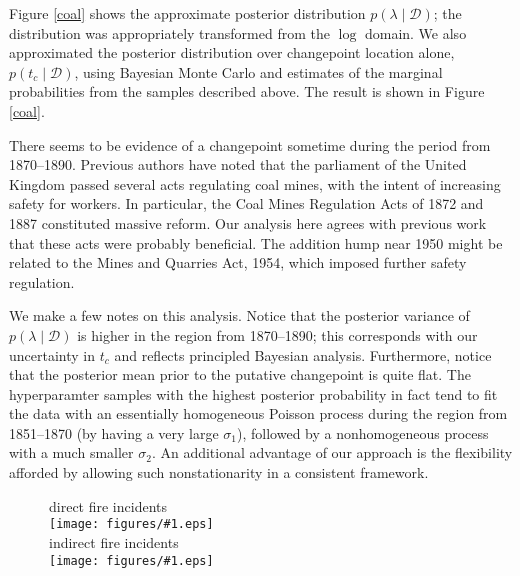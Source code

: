 \documentclass{article}
\newcommand{\psff}[1]{\texttt{[image: figures/\#1.eps]}}
\newcommand{\cm}[1]{\mathcal{#1}}
\newcommand{\data}{\cm{D}}
\newcommand{\given}{\mid}
\begin{document}
Figure \ref{coal} shows the approximate posterior
distribution $p(\lambda \given \data)$; the distribution was
appropriately transformed from the $\log$ domain.  We also
approximated the posterior distribution over changepoint location
alone, $p(t_c \given \data)$, using Bayesian Monte Carlo and estimates
of the marginal probabilities from the samples described above.  The
result is shown in Figure \ref{coal}.

There seems to be evidence of a changepoint sometime during the period
from 1870--1890.  Previous authors have noted that the parliament of
the United Kingdom passed several acts regulating coal mines, with the
intent of increasing safety for workers.  In particular, the Coal
Mines Regulation Acts of 1872 and 1887 constituted massive reform.
Our analysis here agrees with previous work that these acts were
probably beneficial.  The addition hump near 1950 might be related to
the Mines and Quarries Act, 1954, which imposed further safety
regulation.

We make a few notes on this analysis.  Notice that the posterior
variance of $p(\lambda \given \data)$ is higher in the region from
1870--1890; this corresponds with our uncertainty in $t_c$ and reflects
principled Bayesian analysis.  Furthermore, notice that the posterior
mean prior to the putative changepoint is quite flat.  The
hyperparamter samples with the highest posterior probability in fact
tend to fit the data with an essentially homogeneous Poisson process
during the region from 1851--1870 (by having a very large $\sigma_1$),
followed by a nonhomogeneous process with a much smaller $\sigma_2$.
An additional advantage of our approach is the flexibility afforded by
allowing such nonstationarity in a consistent framework.

\begin{figure}
  \centering
  \hspace*{1em} direct fire incidents 
  \vspace*{1ex} \\
  \psff{direct} \\
  \vspace*{2ex}
  \hspace*{1em} indirect fire incidents
  \vspace*{1ex} \\
  \psff{indirect} \\
\end{figure}


\end{document}
